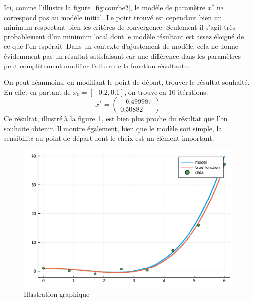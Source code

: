 \documentclass[a4paper,11pt]{article}
\numberwithin{equation}{section}
\begin{document}
Ici, comme l'illustre la figure~\ref{fig:courbe2}, le modèle de paramètre $x^{*}$ ne correspond pas au modèle initial. Le point trouvé est cependant bien un minimum respectant bien les critères de convergence. Seulement il s'agit très probablement d'un minimum local dont le modèle résultant est assez éloigné de ce que l'on espérait. Dans un contexte d'ajustement de modèle, cela ne donne évidemment pas un résultat satisfaisant car une différence dans les paramètres peut complètement modifier l'allure de la fonction résultante.

On peut néanmoins, en modifiant le point de départ, trouver le résultat souhaité.
En effet en partant de $x_{0} = [-0.2,0.1]$, on trouve en 10 itérations:
$$
 x^{*} = \begin{pmatrix}
-0.499987\\
0.50882
\end{pmatrix}$$
Ce résultat, illustré à la figure~\ref{fig:courbe3}, est bien plus proche du résultat que l'on souhaite obtenir. Il montre également, bien que le modèle soit simple, la sensibilité au point de départ dont le choix est un élément important.
\begin{figure}[htbp]
\centering
\includegraphics[scale=0.6]{images/courbe3}
\caption{Illustration graphique}
\label{fig:courbe3}
\end{figure}


%


\end{document}
